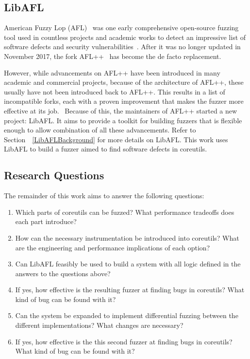\documentclass{article}
\let\savedCite=\cite
\renewcommand{\cite}{\unskip~\savedCite}
\let\savedRef=\ref
\renewcommand{\ref}{\unskip~\savedRef}
\begin{document}
\begin{multicols}{2}
    \subsection{LibAFL}
    \label{LibAFLHistory}

    American Fuzzy Lop (AFL)\cite{AFL} was one early comprehensive open-source fuzzing tool used in countless projects and academic works to detect an impressive list of software defects and security vulnerabilities\cite{AFLBugs}. After it was no longer updated in November 2017, the fork AFL++\cite{AFLPlusPlus} has become the de facto replacement.

    However, while advancements on AFL++ have been introduced in many academic and commercial projects, because of the architecture of AFL++, these usually have not been introduced back to AFL++. This results in a list of incompatible forks, each with a proven improvement that makes the fuzzer more effective at its job.\cite{LibAFL} Because of this, the maintainers of AFL++ started a new project: LibAFL. It aims to provide a toolkit for building fuzzers that is flexible enough to allow combination of all these advancements. Refer to Section~\ref{LibAFLBackground} for more details on LibAFL. This work uses LibAFL to build a fuzzer aimed to find software defects in coreutils.

    \subsection{Research Questions}
    \label{ResearchQuestions}

    The remainder of this work aims to answer the following questions:

    \begin{enumerate}
        \item Which parts of coreutils can be fuzzed? What performance tradeoffs does each part introduce?
        \item How can the necessary instrumentation be introduced into coreutils? What are the engineering and performance implications of each option?
        \item Can LibAFL feasibly be used to build a system with all logic defined in the answers to the questions above?
        \item If yes, how effective is the resulting fuzzer at finding bugs in coreutils? What kind of bug can be found with it?
        \item Can the system be expanded to implement differential fuzzing between the different implementations? What changes are necessary?
        \item If yes, how effective is the this second fuzzer at finding bugs in coreutils? What kind of bug can be found with it?
    \end{enumerate}


\end{multicols}
\end{document}
